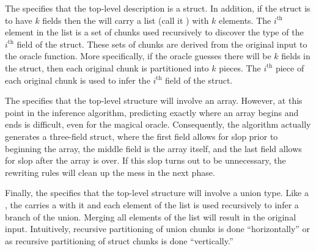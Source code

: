 The  specifies that the top-level description is a
struct.  In addition, if the struct is to have $k$ fields then the
 will carry a list (call it ) with $k$
elements.  The $i^{\mathrm{th}}$ element in the list is a set of
chunks used recursively to discover the type of the $i^{\mathrm{th}}$
field of the struct.  These sets of chunks are derived from the
original input to the oracle function. More specifically, if the
oracle guesses there will be $k$ fields in the struct, then each original
chunk is partitioned into $k$ pieces. The $i^{\mathrm{th}}$ piece of
each original chunk is used to infer the $i^{\mathrm{th}}$ field of
the struct.

The  specifies that the top-level structure will
involve an array.  However, at this point in the inference algorithm,
predicting exactly where an array begins and ends is difficult, even
for the magical oracle.  Consequently, the algorithm actually
generates a three-field struct, where the first field allows for slop
prior to beginning the array, the middle field is the array itself,
and the last field allows for slop after the array is over.  If this
slop turns out to be unnecessary, the rewriting rules will clean up
the mess in the next phase.

Finally, the  specifies that the top-level structure
will involve a union type.  Like a , the
 carries a  with it and each element
of the list is used recursively to infer a branch of the union.
Merging all elements of the list will result in the original input.
Intuitively, recursive partitioning of union chunks is done
``horizontally'' or as recursive partitioning of struct chunks is done
``vertically.''

